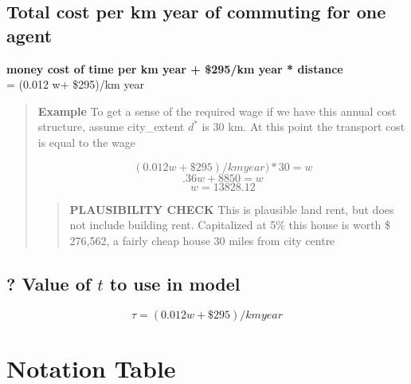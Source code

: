 \subsection{Total cost per km year of commuting for one agent}
\textbf{money cost of time per km year + \$295/km year * distance} \\
= (0.012 w+ \$295)/km year 
    \begin{quotation}
    \textbf{Example}
    To get a sense of the required wage if we have this annual cost structure, assume city\_extent $d^*$ is 30 km. At this point the transport cost is equal to the wage

\[(0.012 w+ \$295)/km year)*30 =  w\] 
\[.36w+ 8850=w\]
\[w=13828.12\]
        \begin{quotation}
        \textbf{PLAUSIBILITY CHECK}
This is plausible land rent, but does not include building rent. 
Capitalized at 5\% this house is worth \$ 276,562, a fairly cheap house 30 miles from city centre
        \end{quotation}
    \end{quotation}

{\color{red}
\subsection{? Value of $t$ to use in model}}
\[ \tau=(0.012 w+ \$295)/km year \]


\newpage
\section{Notation Table}
